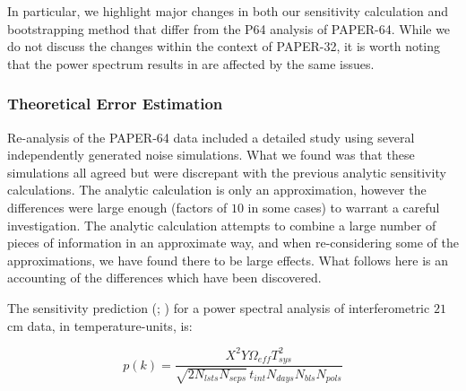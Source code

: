 \documentclass[preprint2,numberedappendix,tighten]{aastex6}  %
\begin{document}
In particular, we highlight major changes in both our sensitivity calculation and bootstrapping method that differ from the P64 
analysis of PAPER-64. While we do not discuss the changes within the context of PAPER-32, it is worth noting that the power 
spectrum results in \citet{parsons_et_al2014} are affected by the same issues.

\subsubsection{Theoretical Error Estimation}
\label{sec:PSSense}

Re-analysis of the PAPER-64 data included a detailed study using several independently generated noise simulations. What we 
found was that these simulations all agreed but were discrepant with the previous analytic sensitivity calculations. The analytic 
calculation is only an approximation, however the differences were large enough (factors of $10$ in some cases) to warrant a 
careful investigation. The analytic calculation attempts to combine a large number of pieces of information in an approximate 
way, and when re-considering some of the approximations, we have found there to be large effects. What follows here is an 
accounting of the differences which have been discovered.

The sensitivity prediction (\citealt{parsons_et_al2012a}; \citealt{pober_et_al2013}) for a power spectral analysis of 
interferometric $21$ cm data, in temperature-units, is:

\begin{equation}
\label{eq:sense}
p(k) = \frac{X^{2}Y \Omega_{eff} T_{sys}^{2}}{\sqrt{2N_{lsts}N_{seps}}\,t_{int}N_{days}N_{bls}N_{pols}}
\end{equation}
\end{document}
